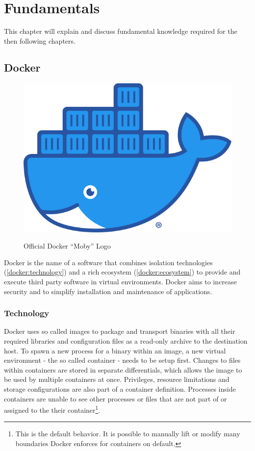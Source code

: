 \chapter{Fundamentals}

This chapter will explain and discuss fundamental knowledge required for the then following chapters.

\section{Docker}

\begin{figure}
	\centering
	\includegraphics[width=.2\textwidth]{res/docker-Moby-logo.png}
	\label{docker:logo}
	\caption{Official Docker \enquote{Moby} Logo\cite{docker:logo}}
\end{figure}

Docker is the name of a software that combines isolation technologies (\autoref{docker:technology}) and a rich ecosystem (\autoref{docker:ecosystem}) to provide and execute third party software in virtual environments.
Docker aims to increase security and to simplify installation and maintenance of applications.


\subsection{Technology}
\label{docker:technology}

Docker uses so called images to package and transport binaries with all their required libraries and configuration files as a read-only archive to the destination host.
To spawn a new process for a binary within an image, a new virtual environment - the so called container - needs to be setup first.
Changes to files within containers are stored in separate differentials, which allows the image to be used by multiple containers at once.
Privileges, resource limitations and storage configurations are also part of a container definition.
Processes inside containers are unable to see  other processes or files that are not part of or assigned to the their container\footnote{This is the default behavior. It is possible to manually lift or modify many boundaries Docker enforces for containers on default.}.

